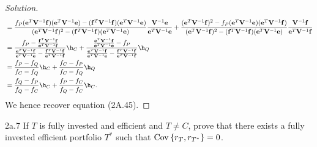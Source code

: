 \begin{proof}[Solution]
\begin{align*}
&= \frac{f_{P}(\mathbf{e}^{T}\mathbf{V}^{-1}\mathbf{f})(\mathbf{e}^{T}\mathbf{V}^{-1}\mathbf{e}) - (\mathbf{f}^{T}\mathbf{V}^{-1}\mathbf{f})(\mathbf{e}^{T}\mathbf{V}^{-1}\mathbf{e})}{(\mathbf{e}^{T}\mathbf{V}^{-1}\mathbf{f})^{2} - (\mathbf{f}^{T}\mathbf{V}^{-1}\mathbf{f})(\mathbf{e}^{T}\mathbf{V}^{-1}\mathbf{e})}\frac{\mathbf{V}^{-1}\mathbf{e}}{\mathbf{e}^{T}\mathbf{V}^{-1}\mathbf{e}} + \frac{(\mathbf{e}^{T}\mathbf{V}^{-1}\mathbf{f})^{2} - f_{P}(\mathbf{e}^{T}\mathbf{V}^{-1}\mathbf{e})(\mathbf{e}^{T}\mathbf{V}^{-1}\mathbf{f})}{(\mathbf{e}^{T}\mathbf{V}^{-1}\mathbf{f})^{2} - (\mathbf{f}^{T}\mathbf{V}^{-1}\mathbf{f})(\mathbf{e}^{T}\mathbf{V}^{-1}\mathbf{e})}\frac{\mathbf{V}^{-1}\mathbf{f}}{\mathbf{e}^{T}\mathbf{V}^{-1}\mathbf{f}}\\
&= \frac{f_{P} - \frac{\mathbf{f}^{T}\mathbf{V}^{-1}\mathbf{f}}{\mathbf{e}^{T}\mathbf{V}^{-1}\mathbf{f}}}{\frac{\mathbf{e}^{T}\mathbf{V}^{-1}\mathbf{f}}{\mathbf{e}^{T}\mathbf{V}^{-1}\mathbf{e}} - \frac{\mathbf{f}^{T}\mathbf{V}^{-1}\mathbf{f}}{\mathbf{e}^{T}\mathbf{V}^{-1}\mathbf{f}}}\h_{C} + \frac{\frac{\mathbf{e}^{T}\mathbf{V}^{-1}\mathbf{f}}{\mathbf{e}^{T}\mathbf{V}^{-1}\mathbf{e}} - f_{P}}{\frac{\mathbf{e}^{T}\mathbf{V}^{-1}\mathbf{f}}{\mathbf{e}^{T}\mathbf{V}^{-1}\mathbf{e}} - \frac{\mathbf{f}^{T}\mathbf{V}^{-1}\mathbf{f}}{\mathbf{e}^{T}\mathbf{V}^{-1}\mathbf{f}}}\h_{Q}\\
&= \frac{f_{P} - f_{Q}}{f_{C} - f_{Q}}\h_{C} + \frac{f_{C} - f_{P}}{f_{C} - f_{Q}}\h_{Q}\\
&= \frac{f_{Q} - f_{P}}{f_{Q} - f_{C}}\h_{C} + \frac{f_{P} - f_{C}}{f_{Q} - f_{C}}\h_{C}.
\end{align*}
We hence recover equation (2A.45).
\end{proof}


\begin{problem}{2a.7}
If $T$ is fully invested and efficient and $T \neq C$, prove that there exists a fully invested efficient portfolio $T^{\ast}$ such that $\mathrm{Cov}\left\lbrace r_{T}, r_{T^{\ast}}\right\rbrace = 0$.
\end{problem}

